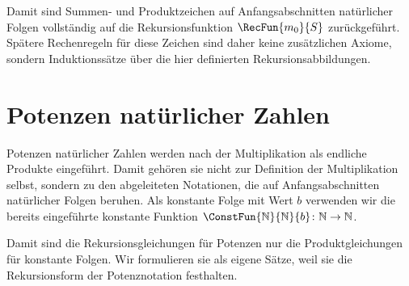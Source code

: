 \documentclass[main.tex]{subfiles}
\begin{document}
Damit sind Summen- und Produktzeichen auf Anfangsabschnitten natürlicher
Folgen vollständig auf die Rekursionsfunktion \(\RecFun{m_0}{S}\)
zurückgeführt. Spätere Rechenregeln für diese Zeichen sind daher keine
zusätzlichen Axiome, sondern Induktionssätze über die hier definierten
Rekursionsabbildungen.

\section{Potenzen natürlicher Zahlen}

Potenzen natürlicher Zahlen werden nach der Multiplikation als endliche
Produkte eingeführt. Damit gehören sie nicht zur Definition der
Multiplikation selbst, sondern zu den abgeleiteten Notationen, die auf
Anfangsabschnitten natürlicher Folgen beruhen. Als konstante Folge mit Wert
\(b\) verwenden wir die bereits eingeführte konstante Funktion
\(\ConstFun{\mathbb{N}}{\mathbb{N}}{b}\colon\mathbb{N}\to\mathbb{N}\).


\begin{tabproof}
\end{tabproof}

Damit sind die Rekursionsgleichungen für Potenzen nur die Produktgleichungen
für konstante Folgen. Wir formulieren sie als eigene Sätze, weil sie die
Rekursionsform der Potenznotation festhalten.
\end{document}
